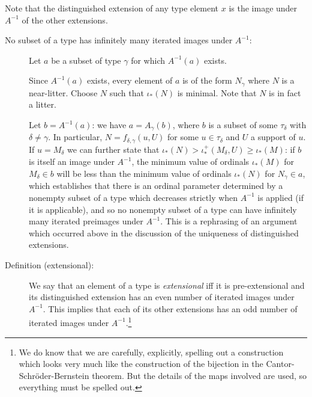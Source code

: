 \documentclass[112pt]{article}
\begin{document}
\begin{description}
\end{description}

Note that the distinguished extension of any type element $x$ is the image under $A^{-1}$ of the other extensions.

\begin{description}

\item[No subset of a type has infinitely many iterated images under $A^{-1}$:]  Let $a$ be a subset of type $\gamma$ for which $A^{-1}(a)$ exists.  

Since $A^{-1}(a)$ exists, every element of $a$ is of the form $N_\gamma$ where $N$ is a near-litter.  Choose $N$ such that $\iota_*(N)$ is minimal.  Note that $N$ is in fact a litter.

Let $b = A^{-1}(a)$:  we have $a = A_\gamma(b)$, where $b$ is a subset of some $\tau_\delta$ with $\delta \neq \gamma$.  In particular, $N = f_{\delta,\gamma}(u,U)$ for
some $u \in \tau_\delta$ and $U$ a support of $u$.  If $u=M_\delta$ we can further state that $\iota_*(N) > \iota^+_*(M_\delta,U) \geq \iota_*(M)$:  if $b$ is itself an image under $A^{-1}$, the minimum value of ordinals $\iota_*(M)$ for $M_\delta \in b$ will be less than the minimum value of ordinals $\iota_*(N)$ for $N_\gamma\in a$, which establishes that there is an ordinal parameter determined by a nonempty subset of a type which decreases strictly when $A^{-1}$ is applied (if it is applicable), and so no nonempty subset of a type
can have infinitely many iterated preimages under $A^{-1}$.  This is a rephrasing of an argument which occurred above in the discussion of the uniqueness of distinguished extensions.

\item[Definition (extensional):]  We say that an element of a type is {\em extensional\/} iff
it is pre-extensional and its distinguished extension has an even number of iterated images under $A^{-1}$.
This implies that each of its other extensions has an odd number of iterated images under $A^{-1}$.\footnote{We do know that we are carefully, explicitly, spelling out a construction which looks very much
like the construction of the bijection in the Cantor-Schr\"oder-Bernstein theorem.  But the details of the maps involved are used, so everything must be spelled out.}


\end{description}
\end{document}
